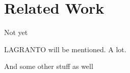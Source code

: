 \setcounter{chapter}{1}

\chapter{Related Work}

Not yet

LAGRANTO will be mentioned. A lot.

And some other stuff as well


